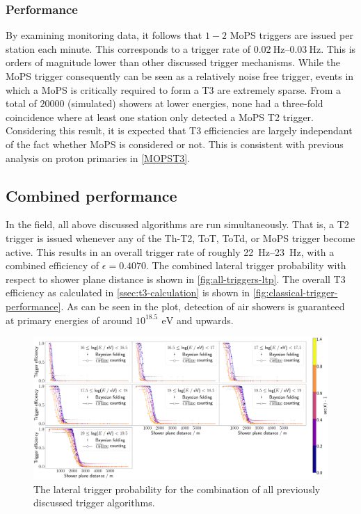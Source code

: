\subsubsection{Performance}
\label{ssec:mops-performance}

By examining monitoring data, it follows that $1-2$ MoPS triggers are issued per station each minute. This corresponds to a trigger rate of 
$\SIrange[range-phrase = \,\text{to}\,]{0.02}{0.03}{\hertz}$. This is orders of magnitude lower than other discussed trigger mechanisms. While the MoPS trigger 
consequently can be seen as a relatively noise free trigger, events in which a MoPS is critically required to form a T3 are extremely sparse. From a total of 
$20000$ (simulated) showers at lower energies, none had a three-fold coincidence where at least one station only detected a MoPS T2 trigger. Considering this 
result, it is expected that T3 efficiencies are largely independant of the fact whether MoPS is considered or not. This is consistent with previous analysis
on proton primaries in \autoref{MOPST3}.

\subsection{Combined performance}
\label{ssec:combined-performance}

In the field, all above discussed algorithms are run simultaneously. That is, a T2 trigger is issued whenever any of the Th-T2, ToT, ToTd, or MoPS trigger become 
active. This results in an overall trigger rate of roughly \SIrange[range-phrase = \,\text{to}\,]{22}{23}{\hertz}, with a combined efficiency of 
$\epsilon = 0.4070$. The combined lateral trigger probability with respect to shower plane distance is shown in \autoref{fig:all-triggers-ltp}. The overall T3 
efficiency as calculated in \autoref{ssec:t3-calculation} is shown in \autoref{fig:classical-trigger-performance}. As can be seen in the plot, detection of air 
showers is guaranteed at primary energies of around $10^{18.5}\,\SI{}{\electronvolt}$ and upwards.

\begin{figure}
	\centering
	\includegraphics[width=\textwidth]{./plots/all_LTP_comparison.png}
	\caption{The lateral trigger probability for the combination of all previously discussed trigger algorithms.} 
	\label{fig:all-triggers-ltp}
\end{figure}
